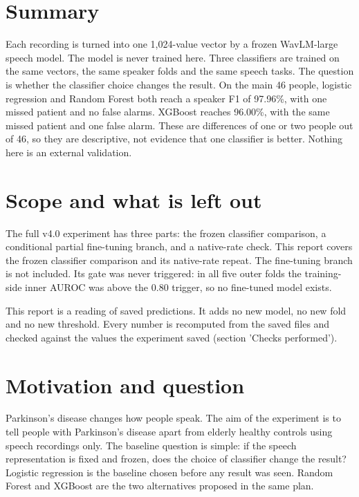 \documentclass[11pt,a4paper]{article}
\begin{document}
\section{Summary}\label{sec:summary}
Each recording is turned into one 1,024-value vector by a frozen WavLM-large speech model. The model is never trained here. Three classifiers are trained on the same vectors, the same speaker folds and the same speech tasks. The question is whether the classifier choice changes the result. On the main 46 people, logistic regression and Random Forest both reach a speaker F1 of 97.96\%, with one missed patient and no false alarms. XGBoost reaches 96.00\%, with the same missed patient and one false alarm. These are differences of one or two people out of 46, so they are descriptive, not evidence that one classifier is better. Nothing here is an external validation.

\section{Scope and what is left out}\label{sec:scope}
The full v4.0 experiment has three parts: the frozen classifier comparison, a conditional partial fine-tuning branch, and a native-rate check. This report covers the frozen classifier comparison and its native-rate repeat. The fine-tuning branch is not included. Its gate was never triggered: in all five outer folds the training-side inner AUROC was above the 0.80 trigger, so no fine-tuned model exists.

\begin{tcolorbox}[colback=green!3,colframe=green!40!black,boxrule=0.5pt,arc=2pt,left=5pt,right=5pt,top=3pt,bottom=3pt,title={\small\bfseries In plain words}]\small This report is a reading of saved predictions. It adds no new model, no new fold and no new threshold. Every number is recomputed from the saved files and checked against the values the experiment saved (section 'Checks performed').\end{tcolorbox}
\section{Motivation and question}\label{sec:motivation}
Parkinson's disease changes how people speak. The aim of the experiment is to tell people with Parkinson's disease apart from elderly healthy controls using speech recordings only. The baseline question is simple: if the speech representation is fixed and frozen, does the choice of classifier change the result? Logistic regression is the baseline chosen before any result was seen. Random Forest and XGBoost are the two alternatives proposed in the same plan.
\end{document}
